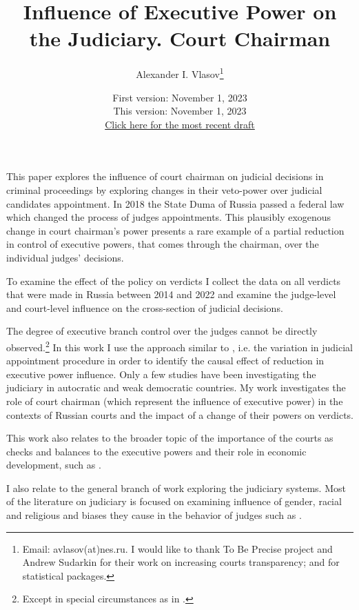 \documentclass[12pt]{article}
\title{Influence of Executive Power on the Judiciary. Court Chairman}
\author{Alexander I. Vlasov\thanks{Email: avlasov(at)nes.ru. I would like to thank To Be Precise project and Andrew Sudarkin for their work on increasing courts transparency; and \citet{R,tidyverse,Spark,sparklyr,Stargazer,plm} for statistical packages.}}
\date{\normalsize First version: November 1, 2023\\\vspace{1ex} This version: November 1, 2023\\ \vspace{1ex}
\href{https:}{Click here for the most recent draft} }
\numberwithin{equation}{section}
\numberwithin{table}{section}
\numberwithin{figure}{section}
\begin{document}
\maketitle




This paper explores the influence of court chairman on judicial decisions in criminal proceedings by exploring changes in their veto-power over judicial candidates appointment. 
In 2018 the State Duma of Russia passed a federal law which changed the process of judges appointments. 
This plausibly exogenous change in court chairman's power presents a rare example of a partial reduction in control of executive powers, that comes through the chairman, over the individual judges' decisions.

To examine the effect of the policy on verdicts I collect the data on all verdicts that were made in Russia between 2014 and 2022 and examine the judge-level and court-level influence on the cross-section of judicial decisions.

The degree of executive branch control over the judges cannot be directly observed.\footnote{Except in special circumstances as in \citet{Mcmillan2004}.} 
In this work I use  the approach similar to \citet{Mehmood2022}, i.e. the variation in judicial appointment procedure in order to identify the causal effect of reduction in executive power influence. 
Only a few studies have been investigating the judiciary in autocratic and weak democratic countries. 
My work investigates the role of court chairman (which represent the influence of executive power) in the contexts of Russian courts and the impact of a change of their powers on verdicts.

This work also relates to the broader topic of the importance of the courts as checks and balances to the executive powers and their role in economic development, such as \citet{North1990,Acemoglu2001,LaPorta2004,Rodrik2004}. 

I also relate to the general branch of work exploring the judiciary systems.
Most of the literature on judiciary is focused on examining influence of gender, racial and religious and biases they cause in the behavior of judges such as \citet{Alesina2014, Mehmood2023}.
\end{document}
